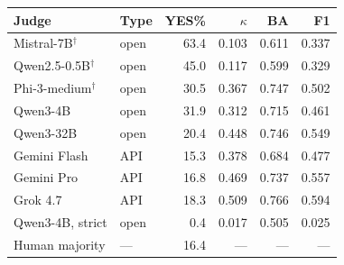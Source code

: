 \begin{tabular}{@{}llrrrr@{}}
\toprule
Judge & Type & YES\% & $\kappa$ & BA & F1 \\
\midrule
Mistral-7B$^\dagger$ & open & 63.4 & 0.103 & 0.611 & 0.337 \\
Qwen2.5-0.5B$^\dagger$ & open & 45.0 & 0.117 & 0.599 & 0.329 \\
Phi-3-medium$^\dagger$ & open & 30.5 & 0.367 & 0.747 & 0.502 \\
Qwen3-4B & open & 31.9 & 0.312 & 0.715 & 0.461 \\
Qwen3-32B & open & 20.4 & 0.448 & 0.746 & 0.549 \\
Gemini Flash & API & 15.3 & 0.378 & 0.684 & 0.477 \\
Gemini Pro & API & 16.8 & 0.469 & 0.737 & 0.557 \\
Grok 4.7 & API & 18.3 & 0.509 & 0.766 & 0.594 \\
\midrule
Qwen3-4B, strict & open & 0.4 & 0.017 & 0.505 & 0.025 \\
Human majority & --- & 16.4 & --- & --- & --- \\
\bottomrule
\end{tabular}
